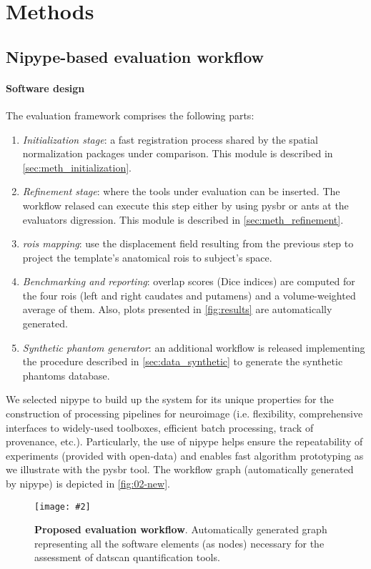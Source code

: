 \documentclass{frontiers}
\newcommand{\insertgraphic}[2]{\texttt{[image: \#2]}}
\newcommand{\cbend}{\relax}
\newcommand{\insertgraphic}[2]{\texttt{[image: \#2]}}
\newcommand{\emitem}[1]{\item \emph{#1}}
\begin{document}
\cbend 


\section{Methods}
\label{sec:methods}

\subsection{Nipype-based evaluation workflow}
\label{sec:evaluation}
\paragraph{Software design}\label{sec:workflow}
The evaluation framework comprises the following parts: 
\begin{enumerate}
\emitem{Initialization stage}: a fast registration process shared by the
  spatial normalization packages under comparison. This module is described
  in \autoref{sec:meth_initialization}.
\emitem{Refinement stage}: where the tools under evaluation can be inserted.
  The workflow relased can execute this step either by using \gls*{pysbr} 
  or \gls*{ants} at the evaluators digression. This module is described
  in \autoref{sec:meth_refinement}.
\emitem{\Glspl{roi} mapping}: use the displacement field resulting from
  the previous step to project the template's anatomical \glspl*{roi} to
  subject's space.
\emitem{Benchmarking and reporting}: overlap scores (Dice indices) are
  computed for the four \glspl*{roi} (left and right caudates and putamens)
  and a volume-weighted average of them. Also, plots presented in
  \autoref{fig:results} are automatically generated.
\emitem{Synthetic phantom generator}: an additional workflow is released
  implementing the procedure described in \autoref{sec:data_synthetic} to
  generate the synthetic phantoms database.
\end{enumerate}
We selected \gls*{nipype} to build up the system for its unique properties for
  the construction of processing pipelines for neuroimage (i.e. flexibility,
  comprehensive interfaces to widely-used toolboxes, efficient batch processing,
  track of provenance, etc.).
Particularly, the use of \gls*{nipype} helps ensure the repeatability of
  experiments (provided with open-data) and enables fast algorithm prototyping
  as we illustrate with the \gls*{pysbr} tool.
The workflow graph (automatically generated by \gls*{nipype}) is depicted in 
  \autoref{fig:02-new}.

\begin{figure*}[!ht]
  \centering
    \insertgraphic{width=\linewidth}{figures/04-nipype-workflow}
  \caption{\label{fig:02-new}
  \textbf{Proposed evaluation workflow}. Automatically generated graph 
  representing all the software elements (as nodes) necessary
  for the assessment of \gls*{datscan} quantification tools.}
\end{figure*}
\end{document}
